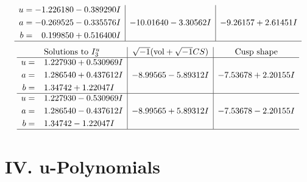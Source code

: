 \documentclass[1p]{elsarticle_modified}
\theoremstyle{definition}
\newcommand{\I}{\sqrt{-1}}
\begin{document}
$$\begin{array}{c|c|c}
\begin{aligned}
u &= -1.226180 - 0.389290 I \\
a &= -0.269525 - 0.335576 I \\
b &= \phantom{-}0.199850 + 0.516400 I\end{aligned}
 & -10.01640 - 3.30562 I & -9.26157 + 2.61451 I\\
 \hline 
 \end{array}$$\newpage$$\begin{array}{c|c|c}  
\text{Solutions to }I^u_{3}& \I (\text{vol} + \sqrt{-1}CS) & \text{Cusp shape}\\
 \hline 
\begin{aligned}
u &= \phantom{-}1.227930 + 0.530969 I \\
a &= \phantom{-}1.286540 + 0.437612 I \\
b &= \phantom{-}1.34742 + 1.22047 I\end{aligned}
 & -8.99565 - 5.89312 I & -7.53678 + 2.20155 I \\ \hline\begin{aligned}
u &= \phantom{-}1.227930 - 0.530969 I \\
a &= \phantom{-}1.286540 - 0.437612 I \\
b &= \phantom{-}1.34742 - 1.22047 I\end{aligned}
 & -8.99565 + 5.89312 I & -7.53678 - 2.20155 I\\
 \hline 
 \end{array}$$\newpage
\newpage\renewcommand{\arraystretch}{1}
\centering \section*{ IV. u-Polynomials}
\end{document}
